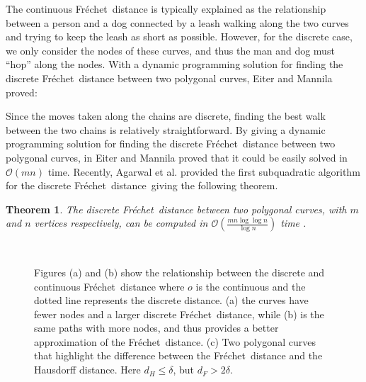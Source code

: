 \documentclass{article}[11pt]
\newcommand{\frechet}{Fr\'echet}
\newcommand{\dfre}{d_F}
\newcommand{\dhaus}{d_H}
\newcommand{\BO}{\mathcal{O}}
\newcommand{\dfd}{discrete \frechet\ distance}
\newtheorem{theorem}{Theorem}
\begin{document}
The continuous \frechet\ distance is typically explained as the relationship between a 
person and a dog connected by a leash walking along the two curves and trying
to keep the leash as short as possible.  However, for the discrete case, we only
consider the nodes of these curves, and thus the man and dog must ``hop'' along
the nodes.
With a dynamic programming solution for finding the discrete \frechet\ distance between 
two polygonal curves, Eiter and Mannila proved:

Since the moves taken along the chains are discrete, finding the best walk between the two chains
is relatively straightforward.
By giving a dynamic programming solution for finding the discrete \frechet\ distance between 
two polygonal curves, in \cite{Eiter:1994:TECH} Eiter and Mannila proved that it could be easily solved in $\BO(mn)$ time.
Recently, Agarwal et al. provided the first subquadratic algorithm for the \dfd\ giving the following theorem. 


\begin{theorem} \label{thm:dfdtime}
The discrete \frechet\ distance between two polygonal curves, with $m$ and $n$ vertices 
respectively, can be computed in $\BO(\frac{mn\log\log n}{\log n})$ time \cite{Agarwal:2013:SODA}.
\end{theorem}



\begin{figure}[ht!]
\begin{center}
        \hspace*{.5cm}
        \hspace*{.5cm}
         \\

    \end{center}
\caption{Figures (a) and (b) show the relationship between the discrete and continuous \frechet\ distance where $o$ is the 
    continuous and the dotted line represents the discrete distance. (a) the curves
    have fewer nodes and a larger discrete \frechet\ distance, while (b) is the same paths with
    more nodes, and thus provides a better approximation of the \frechet\ distance.
    (c) Two polygonal curves that highlight the difference between the \frechet\ distance and the 
        Hausdorff distance. Here $\dhaus \leq \delta$, but $\dfre > 2\delta$.}
    \label{fig:frec_diff}
\end{figure}                              
\end{document}
